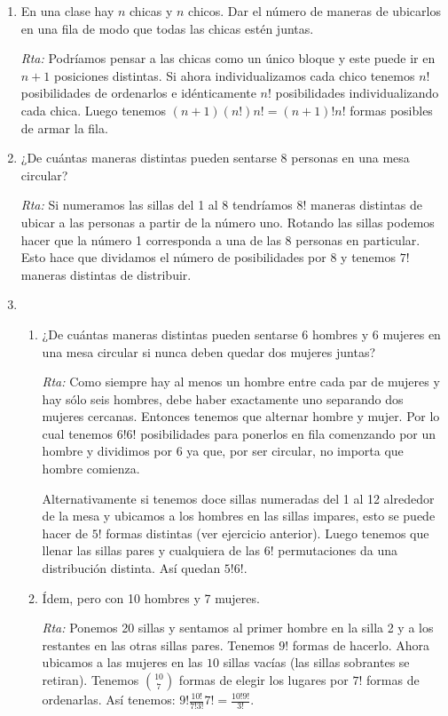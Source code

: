 \documentclass[a4paper,12pt,twoside,spanish,reqno]{amsbook}
\numberwithin{equation}{section}
\begin{document}
\begin{enumerate}
\medskip

\item En una clase hay $n$ chicas y $n$ chicos. Dar el número de maneras de ubicarlos en una fila de modo que todas las chicas estén juntas.

\noindent\textit{Rta:} Podríamos pensar a las chicas como un único bloque y este puede ir en $n+1$ posiciones distintas. Si ahora individualizamos cada chico tenemos $n!$ posibilidades de ordenarlos e idénticamente $n!$ posibilidades individualizando cada chica. Luego tenemos $(n+1)(n!)n!=(n+1)!n!$ formas posibles de armar la fila.

\medskip

\item ¿De cuántas maneras distintas pueden sentarse 8 personas en una mesa circular?

\noindent\textit{Rta:} Si numeramos las sillas del 1 al 8 tendríamos $8!$ maneras distintas de ubicar a las personas a partir de la número uno. Rotando las sillas podemos hacer que la número 1 corresponda a una de las 8 personas en particular. Esto hace que dividamos el número de posibilidades por 8 y tenemos $7!$ maneras distintas de distribuir.

\medskip

\item 
\begin{enumerate}
\item 
¿De cuántas maneras distintas pueden sentarse 6 hombres y 6 mujeres en una
mesa circular si nunca deben quedar dos mujeres juntas?

\noindent\textit{Rta:} Como siempre hay al menos un hombre entre cada par de mujeres y hay sólo seis hombres, debe haber exactamente uno separando dos mujeres cercanas. Entonces tenemos que alternar hombre y mujer. Por lo cual tenemos $6!6!$ posibilidades para ponerlos en fila comenzando por un hombre y dividimos por 6 ya que, por ser circular, no importa que hombre comienza. 

Alternativamente si tenemos doce sillas numeradas del 1 al 12 alrededor de la mesa y ubicamos a los hombres en las sillas impares, esto se puede hacer de $5!$ formas distintas (ver ejercicio anterior). Luego tenemos que llenar las sillas pares y cualquiera de las $6!$ permutaciones da una distribución distinta. Así quedan $5!6!$.

\item Ídem, pero con 10 hombres y 7 mujeres.

\noindent\textit{Rta:}  Ponemos 20 sillas y sentamos al primer  hombre en la silla 2 y  a los restantes en las otras sillas pares. Tenemos $9!$ formas de hacerlo. Ahora ubicamos a las mujeres en las $10$ sillas vacías (las sillas sobrantes se retiran). Tenemos $\binom{10}{7}$ formas de elegir los lugares por $7!$ formas de ordenarlas. Así tenemos: $\displaystyle 9! \frac{10!}{7!3!} 7!=\frac{10!9!}{3!}$.


\end{enumerate}
\end{enumerate}
\end{document}

